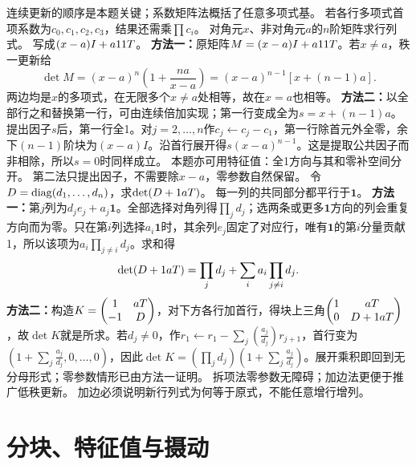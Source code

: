 {连续更新的顺序是本题关键；系数矩阵法概括了任意多项式基。}
{若各行多项式首项系数为$c_0,c_1,c_2,c_3$，结果还需乘$\prod c_i$。}
{对角元$x$、非对角元$a$的$n$阶矩阵求行列式。}
{写成$(x-a)I+a11T$。}
{\textbf{方法一：}原矩阵$M=(x-a)I+a11T$。若$x\ne a$，秩一更新给
\[\det M=(x-a)^n\left(1+\dfrac{na}{x-a}\right)=(x-a)^{n-1}[x+(n-1)a].\]
两边均是$x$的多项式，在无限多个$x\ne a$处相等，故在$x=a$也相等。
\textbf{方法二：}以全部行之和替换第一行，可由连续倍加实现；第一行变成全为$s=x+(n-1)a$。提出因子$s$后，第一行全1。对$j=2,\ldots,n$作$c_j\leftarrow c_j-c_1$，第一行除首元外全零，余下$(n-1)$阶块为$(x-a)I$。沿首行展开得$s(x-a)^{n-1}$。这是提取公共因子而非相除，所以$s=0$时同样成立。}
{本题亦可用特征值：全1方向与其和零补空间分开。}
{第二法只提出因子，不需要除$x-a$，零参数自然保留。}
{令$D=\operatorname{diag}(d_1,\ldots,d_n)$，求$\det(D+1aT)$。}
{每一列的共同部分都平行于$\bm1$。}
{\textbf{方法一：}第$j$列为$d_je_j+a_j\bm1$。全部选择对角列得$\prod_jd_j$；选两条或更多$\bm1$方向的列会重复方向而为零。只在第$i$列选择$a_i\bm1$时，其余列$e_j$固定了对应行，唯有$\bm1$的第$i$分量贡献1，所以该项为$a_i\prod_{j\ne i}d_j$。求和得
\[\det(D+1aT)=\prod_jd_j+\sum_i a_i\prod_{j\ne i}d_j.\]
\textbf{方法二：}构造$K=\begin{pmatrix}1&aT\\-1&D\end{pmatrix}$，对下方各行加首行，得块上三角$\begin{pmatrix}1&aT\\0&D+1aT\end{pmatrix}$，故$\det K$就是所求。若$d_j\ne0$，作$r_1\leftarrow r_1-\sum_j(\frac{a_j}{d_j})r_{j+1}$，首行变为$(1+\sum_j \frac{a_j}{d_j},0,\ldots,0)$，因此$\det K=(\prod_jd_j)(1+\sum_j \frac{a_j}{d_j})$。展开乘积即回到无分母形式；零参数情形已由方法一证明。}
{拆项法零参数无障碍；加边法更便于推广低秩更新。}
{加边必须说明新行列式为何等于原式，不能任意增行增列。}


\section{分块、特征值与摄动}
